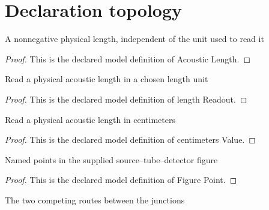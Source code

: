 \section{Declaration topology}
\begin{definition}
  \label{def:physics:phyx-mini-0315:phyxminiproblems-problemphyxmini0315-acousticlength}
  A nonnegative physical length, independent of the unit used to read it
\end{definition}
\begin{proof}
  This is the declared model definition of Acoustic Length.
\end{proof}
\begin{definition}
  \label{def:physics:phyx-mini-0315:phyxminiproblems-problemphyxmini0315-lengthreadout}
  Read a physical acoustic length in a chosen length unit
\end{definition}
\begin{proof}
  This is the declared model definition of length Readout.
\end{proof}
\begin{definition}
  \label{def:physics:phyx-mini-0315:phyxminiproblems-problemphyxmini0315-centimetersvalue}
  Read a physical acoustic length in centimeters
\end{definition}
\begin{proof}
  This is the declared model definition of centimeters Value.
\end{proof}
\begin{definition}
  \label{def:physics:phyx-mini-0315:phyxminiproblems-problemphyxmini0315-figurepoint}
  Named points in the supplied source--tube--detector figure
\end{definition}
\begin{proof}
  This is the declared model definition of Figure Point.
\end{proof}
\begin{definition}
  \label{def:physics:phyx-mini-0315:phyxminiproblems-problemphyxmini0315-tubebranch}
  The two competing routes between the junctions
\end{definition}
